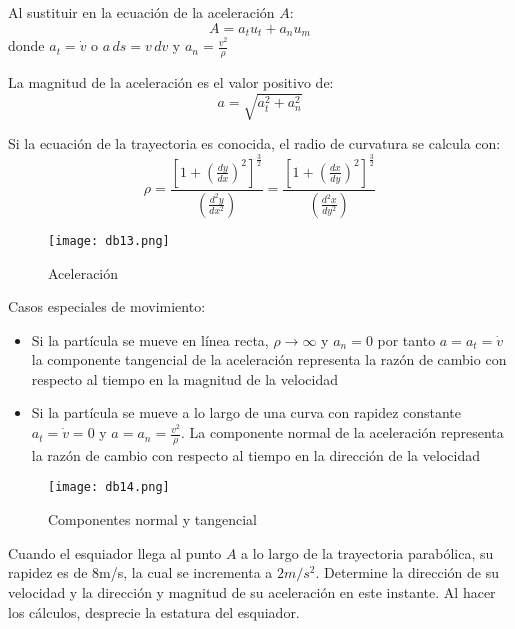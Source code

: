 Al sustituir en la ecuación de la aceleración $A$:
\begin{equation}
    A=a_tu_t+a_nu_m
\end{equation}
donde $a_t=\dot{v}$ o $a\,ds=v\,dv$ y $a_n=\frac{v^2}{\rho}$

La magnitud de la aceleración es el valor positivo de:
\begin{equation}
    a=\sqrt{a_t^2+a_n^2}
\end{equation}

Si la ecuación de la trayectoria es conocida, el radio de curvatura se calcula con:
\begin{equation*}
    \rho=\frac{\left[1+\left(\frac{dy}{dx}\right)^2\right]^{\frac{3}{2}}}{\left(\frac{d^2y}{dx^2}\right)}=\frac{\left[1+\left(\frac{dx}{dy}\right)^2\right]^{\frac{3}{2}}}{\left(\frac{d^2x}{dy^2}\right)}
\end{equation*}

\begin{figure}[h!]
  \centerline{\texttt{[image: db13.png]}}
  \caption{Aceleración}
  \label{db13}
\end{figure}

Casos especiales de movimiento:

\begin{itemize}
    \item Si la partícula se mueve en línea recta, $\rho\to\infty$ y $a_n=0$ por tanto $a=a_t=\dot{v}$
    la componente tangencial de la aceleración representa la razón de cambio con respecto al tiempo en la magnitud de la velocidad
    \item Si la partícula se mueve a lo largo de una curva con rapidez constante $a_t=\dot{v}=0$ y $a=a_n=\frac{v^2}{\rho}$. La componente normal de la aceleración representa la razón de cambio con respecto al tiempo en la dirección de la velocidad
\end{itemize}

\begin{figure}[h!]
  \centerline{\texttt{[image: db14.png]}}
  \caption{Componentes normal y tangencial}
  \label{db14}
\end{figure}

\begin{example}
    Cuando el esquiador llega al punto $A$ a lo largo de la trayectoria parabólica, su rapidez es de 8m/s, la cual se incrementa a $2m/s^2$. Determine la dirección de su velocidad y la dirección y magnitud de su aceleración en este instante. Al hacer los cálculos, desprecie la estatura del esquiador.
\end{example}

